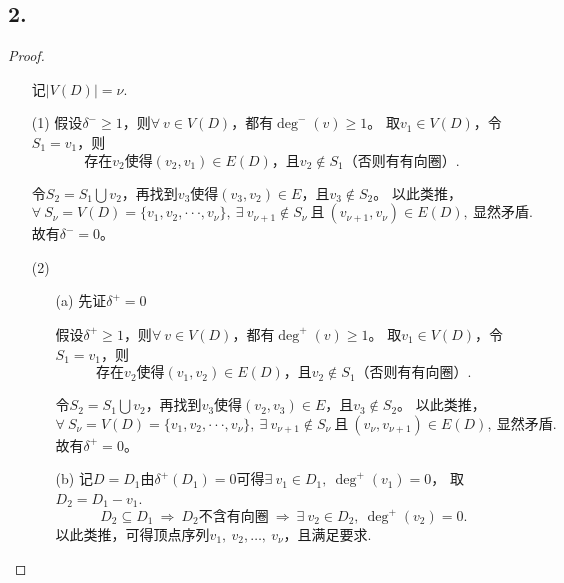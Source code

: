 \documentclass{article}
\begin{document}
\subsection*{2.}
\begin{proof}
    \begin{enumerate}
        \item []记$|V(D)|=\nu $.
        \item [(1)]假设$\delta^-\geq 1$，则$\forall\ v\in V(D)$，都有$\deg^- (v)\geq 1$。
        取$v_1 \in V(D)$，令$S_1 ={v_1}$，则
        \[
            \mbox{存在$v_2$使得$(v_2,v_1)\in E(D)$，且$v_2\notin S_1$（否则有有向圈）.}
        \]
        
        令$S_{2}=S_1 \bigcup{v_2}$，再找到$v_3$使得$(v_3,v_2)\in E$，且$v_3 \notin S_2$。
        以此类推，
        \[
            \forall\ S_\nu = V(D) =\{ v_1,v_2,···,v_\nu \},\ 
            \exists\ v_{\nu+1}\notin S_\nu\ \mbox{且}\ (v_{\nu+1},v_{\nu})\in E(D),\ 
            \mbox{显然矛盾.}
        \]
        故有$\delta^-=0$。
        \item [(2)]
        \begin{enumerate}
            \item []
            \item [(a)]先证$\delta ^+ =0$
            \item []假设$\delta^+ \geq 1$，则$\forall\ v\in V(D)$，都有$\deg^+ (v)\geq 1$。
            取$v_1 \in V(D)$，令$S_1 ={v_1}$，则
            \[
                \mbox{存在$v_2$使得$(v_1,v_2)\in E(D)$，且$v_2\notin S_1$（否则有有向圈）.}
            \]
            
            令$S_{2}=S_1 \bigcup{v_2}$，再找到$v_3$使得$(v_2,v_3)\in E$，且$v_3 \notin S_2$。
            以此类推，
            \[
                \forall\ S_\nu = V(D) =\{ v_1,v_2,···,v_\nu \},\ 
                \exists\ v_{\nu+1}\notin S_\nu\ \mbox{且}\ (v_{\nu},v_{\nu+1})\in E(D),\ 
                \mbox{显然矛盾.}
            \]
            故有$\delta^+=0$。
            \item [(b)]记$D=D_1$由$\delta ^+ (D_1)=0$可得$\exists\ v_1\in D_1,\ \deg ^+ (v_1)=0$，
            取$D_2=D_1 -v_1$.
            \[
                D_2\subseteq D_1\ \Rightarrow\ 
                D_2 \mbox{不含有向圈}\ \Rightarrow\ 
                \exists\ v_2\in D_2,\ \deg^+ (v_2)=0.
            \]
            以此类推，可得顶点序列$v_1,\ v_2,\ldots,\ v_{\nu}$，且满足要求.
        \end{enumerate}
    \end{enumerate}
\end{proof}
\end{document}
